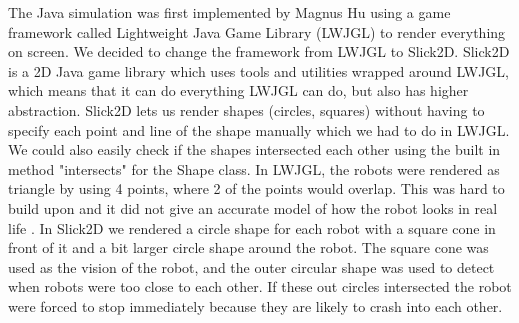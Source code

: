 The Java simulation was first implemented by Magnus Hu using a game framework called Lightweight Java Game Library (LWJGL) to render everything on screen. We decided to change the framework from LWJGL to Slick2D. Slick2D is a 2D Java game library which uses tools and utilities wrapped around LWJGL, which means that it can do everything LWJGL can do, but also has higher abstraction. Slick2D lets us render shapes (circles, squares) without having to specify each point and line of the shape manually which we had to do in LWJGL. We could also easily check if the shapes intersected each other using the built in method "intersects" for the Shape class. In LWJGL, the robots were rendered as triangle by using 4 points, where 2 of the points would overlap. This was hard to build upon and it did not give an accurate model of how the robot looks in real life .
In Slick2D we rendered a circle shape for each robot with a square cone in front of it and a bit larger circle shape around the robot. The square cone was used as the vision of the robot, and the outer circular shape was used to detect when robots were too close to each other. If these out circles intersected the robot were forced to stop immediately because they are likely to crash into each other.\\


